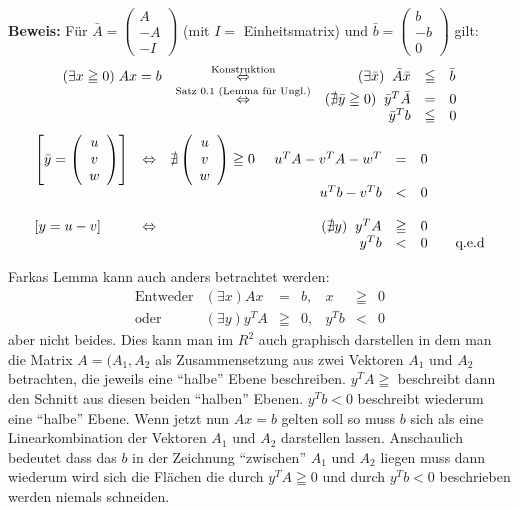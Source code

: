 {\bf Beweis:} Für $\bar{A} = \left(
\begin{array}{c}A\\-A\\-I\end{array}\right)$ (mit $I=$ Einheitsmatrix) und
$\bar{b} = \left( \begin{array}{c}b\\-b\\0\end{array} \right)$ gilt:\\
\[\begin{array}{rcrcl}
(\exists x \geqq 0) \; A x = b &\stackrel{\mbox{\scriptsize Konstruktion}}{\Leftrightarrow}&
(\exists \bar{x}) \; \; \bar{A} \bar{x} &\leqq&\bar{b}\\
&\stackrel{\mbox{\scriptsize Satz 0.1 (Lemma für Ungl.)}}{\Leftrightarrow}&
(\nexists \bar{y} \geqq 0) \; \; \bar{y}^{T} \bar{A} &=&0\\
&&\bar{y}^{T}b&\leqq&0
\end{array}\]
\[\begin{array}{lcrcl}
\left[\bar{y}=\left(\begin{array}{c}u\\v\\w\end{array}\right)\right]
&\Leftrightarrow& \nexists
\left(\begin{array}{c}u\\v\\w\end{array}\right)\geqq 0 \; \; \; \;\;
u^{T}A - v^{T} A - w^{T} &=& 0\\
&&u^{T}b - v^{T} b &<& 0\\\\
\left[ y = u -v\right]&\Leftrightarrow&(\nexists y) \; \; y^{T} A &\geqq&
0\\ &&y^{T}b &<& 0 \hspace{7mm} \mbox{q.e.d}
\end{array}\]


Farkas Lemma kann auch anders betrachtet werden: 
\[\begin{array}{lrclrcl}
\mbox{Entweder}&(\exists x) A x &=& b, & x &\geqq& 0\\
\mbox{oder}&(\exists y) y^{T}A &\geqq& 0, & y^{T}b &<& 0
\end{array}\]
aber nicht beides. Dies kann man im $R^{2}$ auch graphisch darstellen in
dem man die Matrix $A=(A_{1}, A_{2}$ als Zusammensetzung aus zwei 
Vektoren $A_{1}$ und
$A_{2}$ betrachten, die jeweils eine "`halbe"' Ebene beschreiben. $y^{T}A 
\geqq$ beschreibt dann den Schnitt aus diesen beiden "`halben"' Ebenen. 
$y^{T}b < 0$ beschreibt wiederum eine "`halbe"' Ebene. Wenn jetzt nun $A x=b$ 
gelten soll so muss $b$ sich als eine Linearkombination der Vektoren $A_{1}$ 
und $A_{2}$ darstellen lassen. Anschaulich bedeutet dass das $b$ in der 
Zeichnung "`zwischen"' $A_{1}$ und  $A_{2}$ liegen muss dann wiederum wird
sich die Flächen die durch $y^{T}A \geqq 0$ und durch $y^{T}b < 0$
beschrieben werden niemals schneiden. 

